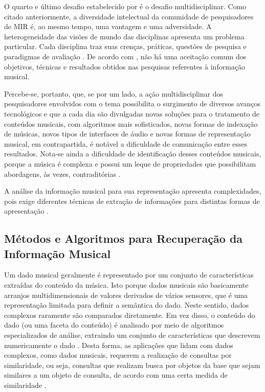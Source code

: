 O quarto e último desafio estabelecido por  é o desafio multidisciplinar. Como citado anteriormente, a diversidade intelectual da comunidade de pesquisadores de MIR é, ao mesmo tempo, uma vantagem e uma adversidade. A heterogeneidade das visões de mundo das disciplinas apresenta um problema particular. Cada disciplina traz suas crenças, práticas, questões de pesquisa e paradigmas de avaliação \cite{downie2003}. De acordo com , não há uma aceitação comum dos objetivos, técnicas e resultados obtidos nas pesquisas referentes à informação musical.

Percebe-se, portanto, que, se por um lado, a ação multidisciplinar dos pesquisadores envolvidos com o tema possibilita o surgimento de diversos avanços tecnológicos e que a cada dia são divulgadas novas soluções para o tratamento de conteúdos musicais, com algoritmos mais sofisticados, novas formas de indexação de músicas, novos tipos de interfaces de áudio e novas formas de representação musical, em contrapartida, é notável a dificuldade de comunicação entre esses resultados. Nota-se ainda a dificuldade de identificação desses conteúdos musicais, porque a música é complexa e possui um leque de propriedades que possibilitam abordagens, às vezes, contraditórias \cite{cruz2014}.

A análise da informação musical para sua representação apresenta complexidades, pois exige diferentes técnicas de extração de informações para distintas formas de apresentação \cite{downie2003}.

\subsection{Métodos e Algoritmos para Recuperação da Informação Musical} \label{subsec:metodos-algoritmos-recuperacao}

Um dado musical geralmente é representado por um conjunto de características extraídas do conteúdo da música. Isto porque dados musicais são basicamente arranjos multidimensionais de valores derivados de vários sensores, que é uma representação limitada para definir a semântica do dado. Neste sentido, dados complexos raramente são comparados diretamente. Em vez disso, o conteúdo do dado (ou uma faceta do conteúdo) é analisado por meio de algoritmos especializados de análise, extraindo um conjunto de características que descrevem numericamente o dado \cite{kaster2012}. Desta forma, as aplicações que lidam com dados complexos, como dados musicais, requerem a realização de consultas por similaridade, ou seja, consultas que realizam busca por objetos da base que sejam similares a um objeto de consulta, de acordo com uma certa medida de similaridade \cite{barioni2006}.

